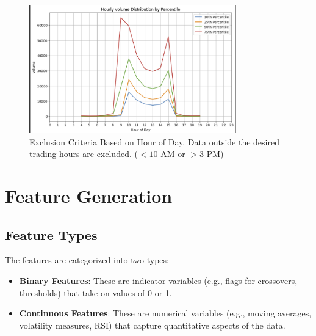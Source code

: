 \documentclass[11pt]{article}
\begin{document}
\begin{figure}[ht]
    \centering
    \includegraphics[width=0.8\textwidth]{exclusion_hour_of_day_1.png}
    \caption{Exclusion Criteria Based on Hour of Day. Data outside the desired trading hours are excluded. ($<10$ AM or $>3$ PM)}
    \label{fig:exclusion_hour}
\end{figure}


\newpage

\section{Feature Generation}

\subsection*{Feature Types}
The features are categorized into two types:
\begin{itemize}
    \item \textbf{Binary Features}: These are indicator variables (e.g., flags for crossovers, thresholds) that take on values of 0 or 1.
    \item \textbf{Continuous Features}: These are numerical variables (e.g., moving averages, volatility measures, RSI) that capture quantitative aspects of the data.
\end{itemize}
\end{document}
